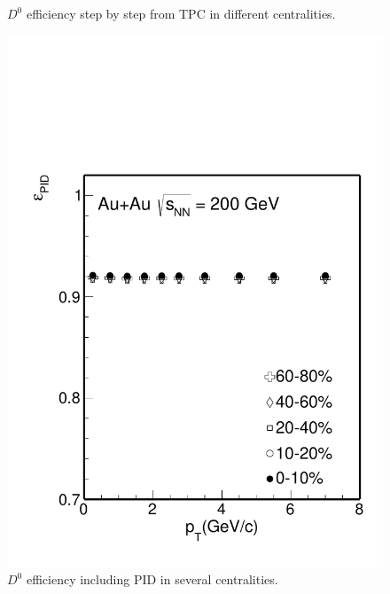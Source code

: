 \begin{figure}[htbp]
\begin{minipage}[htbp]{0.52\linewidth}
\caption{ $D^0$ efficiency step by step from TPC in different centralities. \label{D0effStep1}}
\end{minipage}
\hfill
\begin{minipage}[htbp]{0.52\linewidth}
\centering
\includegraphics[width=1.0\textwidth,angle=0]{figure/Run14_D0HFT/Datad0Eff_pid.pdf} 
\caption{ $D^0$ efficiency including PID in several centralities. \label{D0effStep2}}
\end{minipage}
\end{figure}

